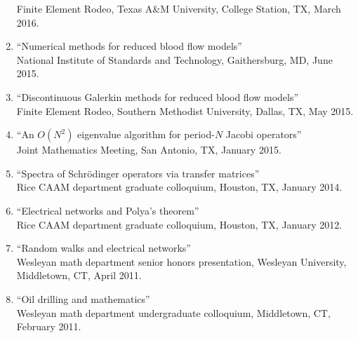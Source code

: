 \documentclass{article} %
\begin{document}
\begin{enumerate}
Finite Element Rodeo, Texas A\&M University, College Station, TX, March 2016.
\item ``Numerical methods for reduced blood flow models'' \\
National Institute of Standards and Technology, Gaithersburg, MD, June 2015.
\item ``Discontinuous Galerkin methods for reduced blood flow models'' \\
Finite Element Rodeo, Southern Methodist University, Dallas, TX, May 2015.
\item ``An $O(N^2)$ eigenvalue algorithm for period-$N$ Jacobi operators'' \\
Joint Mathematics Meeting, San Antonio, TX, January 2015. 
\item ``Spectra of Schr\"odinger operators via transfer matrices'' \\
Rice CAAM department graduate colloquium, Houston, TX, January 2014.
\item ``Electrical networks and Polya's theorem'' \\
Rice CAAM department graduate colloquium, Houston, TX, January 2012.
\item ``Random walks and electrical networks'' \\
Wesleyan math department senior honors presentation, Wesleyan University, Middletown, CT, April 2011.
\item ``Oil drilling and mathematics'' \\ 
Wesleyan math department undergraduate colloquium, Middletown, CT, February 2011.
\end{enumerate}
\end{document}
